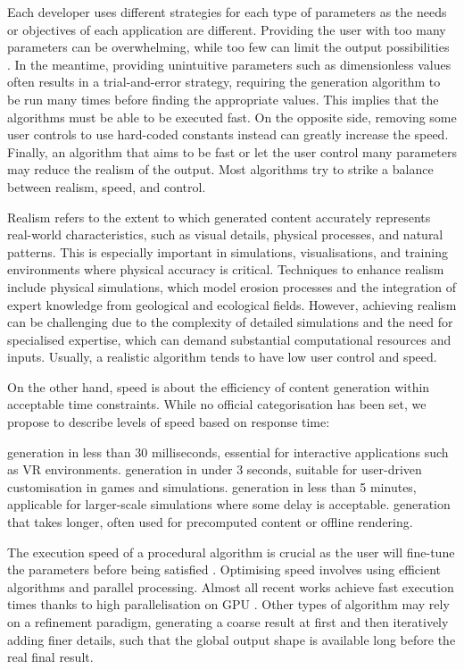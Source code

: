 Each developer uses different strategies for each type of parameters as the needs or objectives of each application are different. Providing the user with too many parameters can be overwhelming, while too few can limit the output possibilities \cite{Togelius2013}. In the meantime, providing unintuitive parameters such as dimensionless values often results in a trial-and-error strategy, requiring the generation algorithm to be run many times before finding the appropriate values. This implies that the algorithms must be able to be executed fast. On the opposite side, removing some user controls to use hard-coded constants instead can greatly increase the speed. Finally, an algorithm that aims to be fast or let the user control many parameters may reduce the realism of the output. Most algorithms try to strike a balance between realism, speed, and control.

Realism refers to the extent to which generated content accurately represents real-world characteristics, such as visual details, physical processes, and natural patterns. This is especially important in simulations, visualisations, and training environments where physical accuracy is critical. Techniques to enhance realism include physical simulations, which model erosion processes and the integration of expert knowledge from geological and ecological fields. However, achieving realism can be challenging due to the complexity of detailed simulations and the need for specialised expertise, which can demand substantial computational resources and inputs. Usually, a realistic algorithm tends to have low user control and speed.

On the other hand, speed is about the efficiency of content generation within acceptable time constraints. While no official categorisation has been set, we propose to describe levels of speed based on response time:
\begin{Itemize}
     generation in less than 30 milliseconds, essential for interactive applications such as VR environments.
     generation in under 3 seconds, suitable for user-driven customisation in games and simulations.
     generation in less than 5 minutes, applicable for larger-scale simulations where some delay is acceptable.
     generation that takes longer, often used for precomputed content or offline rendering.
\end{Itemize}

The execution speed of a procedural algorithm is crucial as the user will fine-tune the parameters before being satisfied \cite{Smelik2014}.
Optimising speed involves using efficient algorithms and parallel processing. Almost all recent works achieve fast execution times thanks to high parallelisation on GPU \cite{Olsen2004}. Other types of algorithm may rely on a refinement paradigm, generating a coarse result at first and then iteratively adding finer details, such that the global output shape is available long before the real final result.

